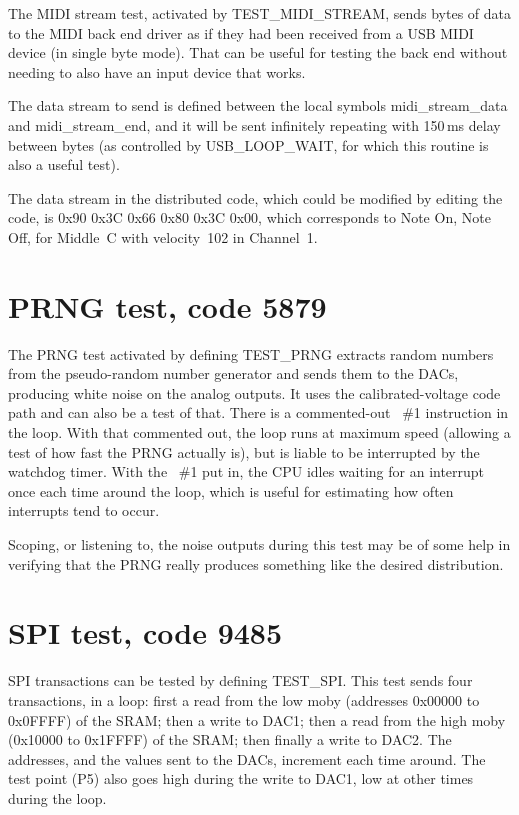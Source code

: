 The MIDI stream test, activated by TEST\_MIDI\_STREAM, sends bytes of data
to the MIDI back end driver as if they had been received from a USB MIDI
device (in single byte mode).  That can be useful for testing the back end
without needing to also have an input device that works.

The data stream to send is defined between
the local symbols midi\_stream\_data and midi\_stream\_end, and it will be
sent infinitely repeating with 150\,ms delay between bytes (as controlled by
USB\_LOOP\_WAIT, for which this routine is also a useful test).

The data stream in the distributed code, which could be modified by editing
the code, is 0x90 0x3C 0x66 0x80 0x3C 0x00, which corresponds to Note On,
Note Off, for Middle~C with velocity~102 in Channel~1.

\section{PRNG test, code 5879}

The PRNG test activated by defining TEST\_PRNG extracts random numbers from
the pseudo-random number generator and sends them to the DACs, producing
white noise on the analog outputs.  It uses the calibrated-voltage code path
and can also be a test of that.  There is a commented-out ~\#1
instruction in the loop.  With that commented out, the loop runs at maximum
speed (allowing a test of how fast the PRNG actually is), but is liable to
be interrupted by the watchdog timer.  With the ~\#1 put in,
the CPU idles waiting for an interrupt once each time around the loop,
which is useful for estimating how often interrupts tend to occur.

Scoping, or listening to, the noise outputs during this test may be of some
help in verifying that the PRNG really produces something like the desired
distribution.

\section{SPI test, code 9485}

SPI transactions can be tested by defining TEST\_SPI.  This test sends four
transactions, in a loop:  first a read from the low moby (addresses 0x00000 to
0x0FFFF) of the SRAM; then a write to DAC1; then a read from the high moby
(0x10000 to 0x1FFFF) of the SRAM; then finally a write to DAC2.  The
addresses, and the values sent to the DACs, increment each time around.  The
test point (P5) also goes high during the write to DAC1, low at other times
during the loop.

